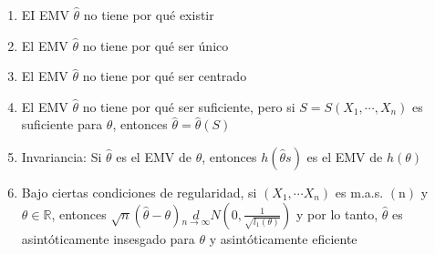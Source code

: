 \begin{observación}
\vspace{-\topsep} %
\vspace{-\topsep} %
\vspace{-\topsep} %
\begin{enumerate}
  \item  EI EMV $\hat{\theta}$ no tiene por qué existir
  \item El EMV $\hat{\theta}$ no tiene por qué ser único
  \item El EMV $\hat{\theta}$ no tiene por qué ser centrado
  \item El EMV $\hat{\theta}$ no tiene por qué ser suficiente, pero si $S=S\left(X_{1},
          \cdots, X_{n}\right)$ es suficiente para $\theta$, entonces
        $\hat{\theta}=\hat{\theta}(S)$
  \item Invariancia: Si $\hat{\theta}$ es el EMV de $\theta$, entonces
        $h(\hat{\theta}s)$ es el EMV de $h(\theta)$
  \item Bajo ciertas condiciones de regularidad, si $\left(X_{1}, \cdots X_{n}\right)$
        es m.a.s. $(\mathrm{n})$ y $\theta \in \mathbb{R}$, entonces
        $\sqrt{n}(\hat{\theta}-\theta) \underset{n \rightarrow \infty}{d} N\left(0,
          \frac{1}{\sqrt{l_{1}(\theta)}}\right)$ y por lo tanto, $\hat{\theta}$ es
        asintóticamente insesgado para $\theta$ y asintóticamente eficiente
\end{enumerate}
\end{observación}






